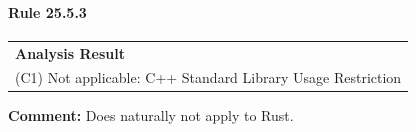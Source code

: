 \paragraph{Rule 25.5.3}
\begin{longtable}{p{13cm}}
\textbf{Analysis Result} \\
(C1) Not applicable: C++ Standard Library Usage Restriction \\
\end{longtable}
\textbf{Comment:} Does naturally not apply to Rust. \\

